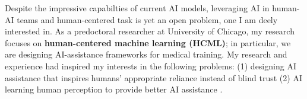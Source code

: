 


Despite the impressive capabilties of current AI models, leveraging AI in human-AI teams and human-centered task is yet an open problem, one I am deely interested in.
As a predoctoral researcher at University of Chicago, my research focuses on \textbf{human-centered machine learning (HCML)}; 
in particular, we are designing AI-assistance frameworks for medical training. 
My research and experience had inspired my interests in the following problems:
(1) designing AI assistance that inspires humans' appropriate reliance instead of blind trust 
(2) AI learning human perception to provide better AI assistance
.



